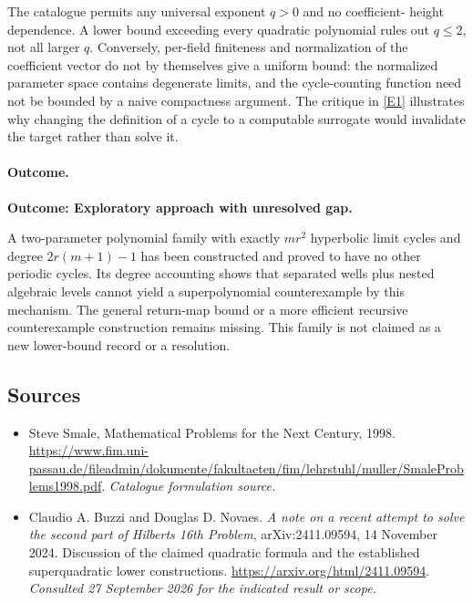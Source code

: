 \documentclass[11pt,a4paper]{article}
\newcommand{\eref}[2]{\hyperlink{extra:#1:#2}{[E#2]}}
\numberwithin{equation}{section}
\begin{document}
The catalogue permits any universal exponent $q>0$ and no coefficient-
height dependence.  A lower bound exceeding every quadratic polynomial
rules out $q\leq2$, not all larger $q$.  Conversely, per-field finiteness
and normalization of the coefficient vector do not by themselves give
a uniform bound: the normalized parameter space contains degenerate
limits, and the cycle-counting function need not be bounded by a
naive compactness argument.  The critique in \eref{30006740}{1} illustrates
why changing the definition of a cycle to a computable surrogate would
invalidate the target rather than solve it.

\paragraph{Outcome.}
\textbf{Outcome: Exploratory approach with unresolved gap.}

A two-parameter polynomial family with exactly $mr^2$ hyperbolic limit
cycles and degree $2r(m+1)-1$ has been constructed and proved to have
no other periodic cycles.  Its degree accounting shows that separated
wells plus nested algebraic levels cannot yield a superpolynomial
counterexample by this mechanism.  The general return-map bound or a
more efficient recursive counterexample construction remains missing.
This family is not claimed as a new lower-bound record or a resolution.
\subsection{Sources}
\begin{itemize}\raggedright
\item[\textnormal{[S1]}]\hypertarget{source:30006740:1}{} Steve Smale, Mathematical Problems for the Next Century, 1998.
\url{https://www.fim.uni-passau.de/fileadmin/dokumente/fakultaeten/fim/lehrstuhl/muller/SmaleProblems1998.pdf}.
{\small\textit{Catalogue formulation source.}}
\item[\textnormal{[E1]}]\hypertarget{extra:30006740:1}{} Claudio A. Buzzi and Douglas D. Novaes.
\emph{A note on a recent attempt to solve the second part of Hilbert\textquotesingle s 16th Problem}, arXiv:2411.09594, 14 November 2024. Discussion of the claimed quadratic formula and the established superquadratic lower constructions.
\url{https://arxiv.org/html/2411.09594}.
{\small\textit{Consulted 27 September 2026 for the indicated result or scope.}}
\end{itemize}
\end{document}
